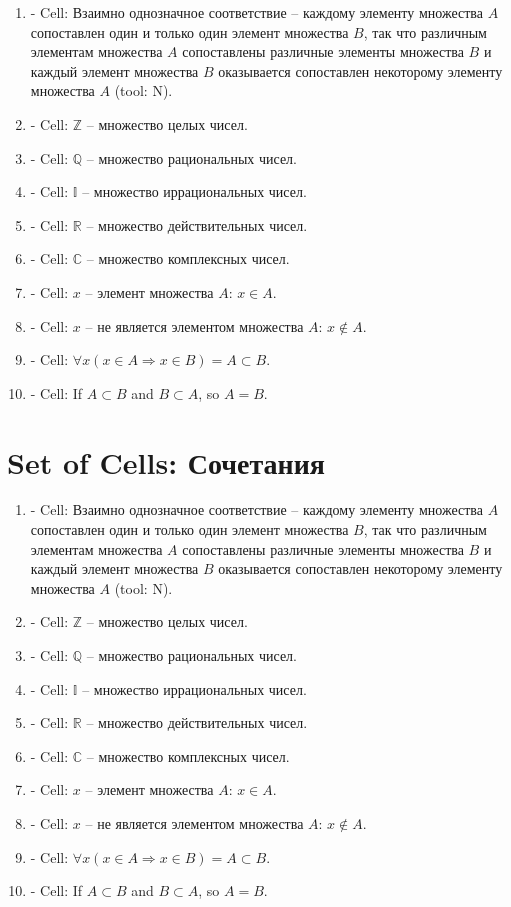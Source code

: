 \documentclass{spaceA}
\begin{document}
\begin{enumerate}
  \item - Cell: Взаимно однозначное соответствие -- каждому элементу множества $A$ сопоставлен один и только один элемент множества $B$, так что различным элементам множества $A$ сопоставлены различные элементы множества $B$ и каждый элемент множества $B$ оказывается сопоставлен некоторому элементу множества $A$ (tool: N).
  \item - Cell: $\mathbb{Z}$ -- множество целых чисел.
  \item - Cell: $\mathbb{Q}$ -- множество рациональных чисел.
  \item - Cell: $\mathbb{I}$ -- множество иррациональных чисел.
  \item - Cell: $\mathbb{R}$ -- множество действительных чисел.
  \item - Cell: $\mathbb{C}$ -- множество комплексных чисел.
  \item - Cell: $x$ -- элемент множества $A$: $x \in A$.
  \item - Cell: $x$ -- не является элементом множества $A$: $x \notin A$.
  \item - Cell: $\forall x \left ( x \in A \Rightarrow x \in B \right ) = A \subset B$.
  \item - Cell: If $A \subset B$ and $B \subset A$, so $A = B$.
\end{enumerate}

\section{Set of Cells: Сочетания}

\begin{enumerate}
  \item - Cell: Взаимно однозначное соответствие -- каждому элементу множества $A$ сопоставлен один и только один элемент множества $B$, так что различным элементам множества $A$ сопоставлены различные элементы множества $B$ и каждый элемент множества $B$ оказывается сопоставлен некоторому элементу множества $A$ (tool: N).
  \item - Cell: $\mathbb{Z}$ -- множество целых чисел.
  \item - Cell: $\mathbb{Q}$ -- множество рациональных чисел.
  \item - Cell: $\mathbb{I}$ -- множество иррациональных чисел.
  \item - Cell: $\mathbb{R}$ -- множество действительных чисел.
  \item - Cell: $\mathbb{C}$ -- множество комплексных чисел.
  \item - Cell: $x$ -- элемент множества $A$: $x \in A$.
  \item - Cell: $x$ -- не является элементом множества $A$: $x \notin A$.
  \item - Cell: $\forall x \left ( x \in A \Rightarrow x \in B \right ) = A \subset B$.
  \item - Cell: If $A \subset B$ and $B \subset A$, so $A = B$.
\end{enumerate}
\end{document}
